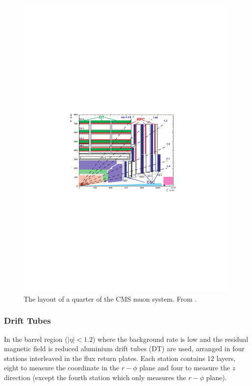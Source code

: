 \begin{figure}[htbp]
  \centering
  \includegraphics[width=0.98\textwidth]{muon_system}
  \caption{The layout of a quarter of the CMS muon system. From \cite{chatrchyan2008cms}.}
  \label{fig:muon_system}
\end{figure}

\subsubsection{Drift Tubes}
In the barrel region ($|\eta| < 1.2$)
where the background rate is low and the residual magnetic field is reduced
 aluminium drift tubes (DT) are used,
arranged in four stations interleaved in the flux return
plates. 
Each station contains 12 layers, eight to measure the coordinate in the
$r-\phi$ plane and four to measure the $z$ direction (except the fourth station
which only measures the $r-\phi$ plane). 

